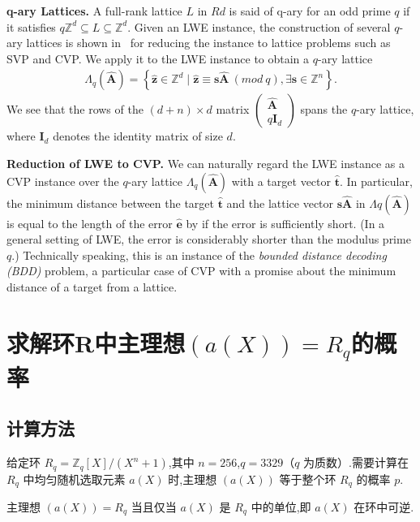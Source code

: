 \documentclass[12pt,a4paper]{article}
\numberwithin{equation}{section}
\begin{document}
\textbf{q-ary Lattices.}
A full-rank lattice $L$ in $Rd$ is said of q-ary for an odd prime $q$ if it satisfies $q \mathbb{Z}^d \subseteq L \subseteq \mathbb{Z}^d$. 
Given an LWE instance, the construction of several $q$-ary lattices is shown in~\cite{micciancioLatticebasedCryptography2009} for reducing the instance to lattice problems such as SVP and CVP. We apply it to the LWE instance to obtain a $q$-ary lattice
\begin{align*}
    \Lambda_q(\mathbf{\hat{A}}) = \left\{ \mathbf{\hat{z}} \in \mathbb{Z}^d \mid \mathbf{\hat{z}} \equiv \mathbf{s}\mathbf{\hat{A}} \ (mod \ q), \exists \mathbf{s} \in \mathbb{Z}^n \right\}.
\end{align*}
We see that the rows of the $(d+n)\times d$ matrix $\left( \begin{matrix}
\mathbf{\hat{A}} \\q\mathbf{I}_d
\end{matrix}\right)$ spans the $q$-ary lattice, where $\mathbf{I}_d$ denotes the identity matrix of size $d$.

\textbf{Reduction of LWE to CVP.} 
We can naturally regard the LWE instance as a CVP instance over the $q$-ary lattice $\Lambda _q(\mathbf{\hat{A}})$ with a target vector $\mathbf{\hat{t}}$. In particular, the minimum distance between the target $\mathbf{\hat{t}}$ and the lattice vector $\mathbf{s}\mathbf{\hat{A}}$ in $\Lambda q(\mathbf{\hat{A}})$ is equal to the length of the error $\mathbf{\hat{e}}$ by if the error is sufficiently short. (In a general setting of LWE, the error is considerably shorter than the modulus prime $q$.) Technically speaking, this is an instance of the \emph{bounded distance decoding (BDD)} problem, a particular case of CVP with a promise about the minimum distance of a target from a lattice. 

\section[求解环R中主理想(a(X))=Rq的概率]{求解环R中主理想$(a(X))=R_q$的概率}
\subsection{计算方法}

给定环 $R_q = \mathbb{Z}_q[X]/(X^n + 1)$,其中 $n = 256$,$q = 3329$（$q$ 为质数）.需要计算在 $R_q$ 中均匀随机选取元素 $a(X)$ 时,主理想 $(a(X))$ 等于整个环 $R_q$ 的概率 $p$.

主理想 $(a(X)) = R_q$ 当且仅当 $a(X)$ 是 $R_q$ 中的单位,即 $a(X)$ 在环中可逆.
\end{document}
